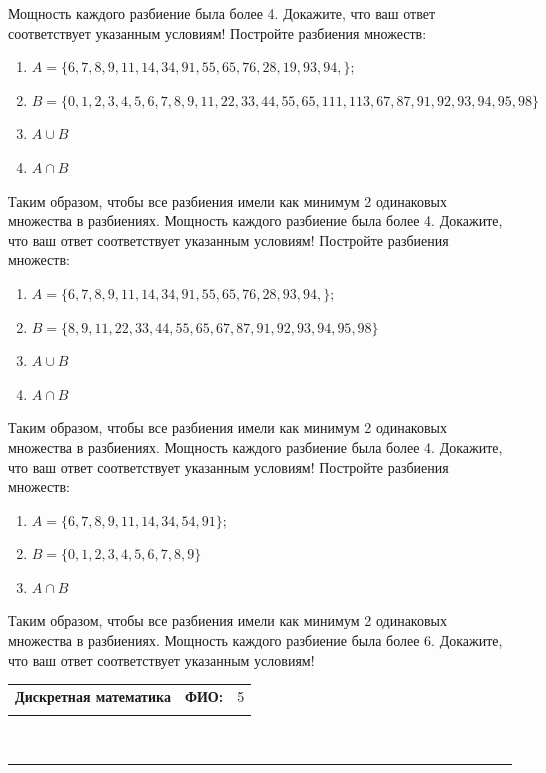\documentclass[10pt]{exam}
\newcommand{\class}{Дискретная математика}
\newcommand{\examdate}{}
\begin{document}
\begin{questions}
Мощность каждого разбиение была более 4.
Докажите, что ваш ответ соответствует указанным условиям!\question
Постройте разбиения множеств:
\begin{enumerate}
	\renewcommand{\labelenumi}{\alph{enumi})}
	\item $A = \{6, 7, 8, 9, 11, 14, 34, 91, 55, 65, 76, 28, 19, 93, 94, \};$
	\item $B = \{0, 1, 2, 3, 4, 5, 6, 7, 8, 9, 11, 22, 33, 44, 55, 65, 111, 113, 67, 87, 91, 92, 93, 94, 95, 98\}$
	\item $A \cup B$
	\item $A \cap B$
\end{enumerate}
Таким образом, чтобы все разбиения имели как минимум 2 одинаковых множества в разбиениях.
Мощность каждого разбиение была более 4.
Докажите, что ваш ответ соответствует указанным условиям!\question
Постройте разбиения множеств:
\begin{enumerate}
	\renewcommand{\labelenumi}{\alph{enumi})}
	\item $A = \{6, 7, 8, 9, 11, 14, 34, 91, 55, 65, 76, 28, 93, 94, \};$
	\item $B = \{8, 9, 11, 22, 33, 44, 55, 65, 67, 87, 91, 92, 93, 94, 95, 98\}$
	\item $A \cup B$
	\item $A \cap B$
\end{enumerate}
Таким образом, чтобы все разбиения имели как минимум 2 одинаковых множества в разбиениях.
Мощность каждого разбиение была более 4.
Докажите, что ваш ответ соответствует указанным условиям!\question
Постройте разбиения множеств:
\begin{enumerate}
	\renewcommand{\labelenumi}{\alph{enumi})}
	\item $A = \{6, 7, 8, 9, 11, 14, 34, 54, 91\};$
	\item $B = \{0, 1, 2, 3, 4, 5, 6, 7, 8, 9\}$
	\item $A \cap B$
\end{enumerate}
Таким образом, чтобы все разбиения имели как минимум 2 одинаковых множества в разбиениях.
Мощность каждого разбиение была более 6.
Докажите, что ваш ответ соответствует указанным условиям!

\end{questions}
\newpage
\begin{flushright}
\begin{tabular}{p{2.8in} r l}
\textbf{\class} & \textbf{ФИО:} &5\\

\textbf{\examdate} &&\\
\end{tabular}\\
\end{flushright}
\rule[1ex]{\textwidth}{.1pt}
\end{document}
